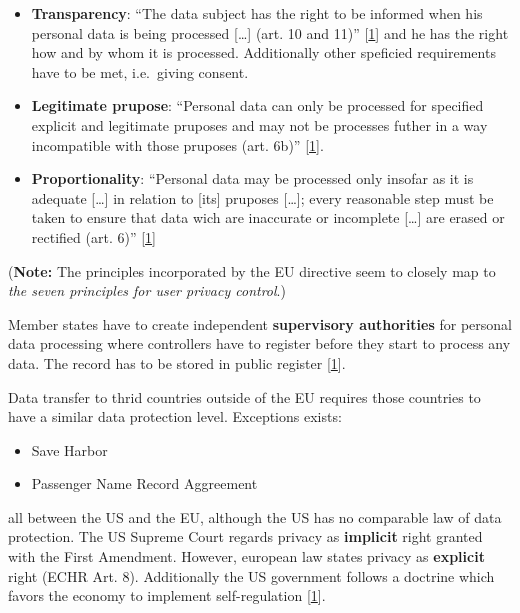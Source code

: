 \begin{itemize}
\itemsep1pt\parskip0pt
\item
  \textbf{Transparency}: ``The data subject has the right to be informed
  when his personal data is being processed {[}\ldots{}{]} (art. 10 and
  11)'' {[}\hyperref[references]{1}{]} and he has the right how and by
  whom it is processed. Additionally other speficied requirements have
  to be met, i.e.~giving consent.
\item
  \textbf{Legitimate prupose}: ``Personal data can only be processed for
  specified explicit and legitimate pruposes and may not be processes
  futher in a way incompatible with those pruposes (art. 6b)''
  {[}\hyperref[references]{1}{]}.
\item
  \textbf{Proportionality}: ``Personal data may be processed only
  insofar as it is adequate {[}\ldots{}{]} in relation to {[}its{]}
  pruposes {[}\ldots{}{]}; every reasonable step must be taken to ensure
  that data wich are inaccurate or incomplete {[}\ldots{}{]} are erased
  or rectified (art. 6)'' {[}\hyperref[references]{1}{]}
\end{itemize}

(\textbf{Note:} The principles incorporated by the EU directive seem to
closely map to \emph{the seven principles for user privacy control}.)

Member states have to create independent \textbf{supervisory
authorities} for personal data processing where controllers have to
register before they start to process any data. The record has to be
stored in public register {[}\hyperref[references]{1}{]}.

Data transfer to thrid countries outside of the EU requires those
countries to have a similar data protection level. Exceptions exists:

\begin{itemize}
\itemsep1pt\parskip0pt
\item
  Save Harbor
\item
  Passenger Name Record Aggreement
\end{itemize}

all between the US and the EU, although the US has no comparable law of
data protection. The US Supreme Court regards privacy as
\textbf{implicit} right granted with the First Amendment. However,
european law states privacy as \textbf{explicit} right (ECHR Art. 8).
Additionally the US government follows a doctrine which favors the
economy to implement self-regulation {[}\hyperref[references]{1}{]}.

